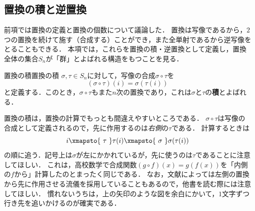 \subsection{置換の積と逆置換}

前項では置換の定義と置換の個数について議論した．
置換は写像であるから，$2$つの置換を続けて施す（合成する）ことができ，また全単射であるから逆写像をとることもできる．
本項では，これらを置換の積・逆置換として定義し，置換全体の集合$S_n$が「群」とよばれる構造をもつことを見る．

\begin{definition}{置換の積}{置換の積}
  $\sigma, \tau \in S_n$に対して，写像の合成$\sigma \circ \tau$を
  \[
  (\sigma \circ \tau)(i) = \sigma(\tau(i))
  \]
  と定義する．このとき，$\sigma \circ \tau$もまた$n$次の置換であり，これは$\sigma$と$\tau$の\textbf{積}とよばれる．
\end{definition}

置換の積は，置換の計算でもっとも間違えやすいところである．
$\sigma \circ \tau$は写像の合成として定義されるので，先に作用するのは\emph{右側}の$\tau$である．
計算するときは
\[
i \xmapsto{\ \tau\ } \tau(i) \xmapsto{\ \sigma\ } \sigma(\tau(i))
\]
の順に追う．記号上は$\sigma$が左にかかれているが，先に使うのは$\tau$であることに注意してほしい．
これは，高校数学で合成関数$(g \circ f)(x) = g(f(x))$を「内側の$f$から」計算したのとまったく同じである．
なお，文献によっては左側の置換から先に作用させる流儀を採用していることもあるので，他書を読む際には注意してほしい．
慣れないうちは，上の矢印のような図を余白にかいて，$1$文字ずつ行き先を追いかけるのが確実である．

